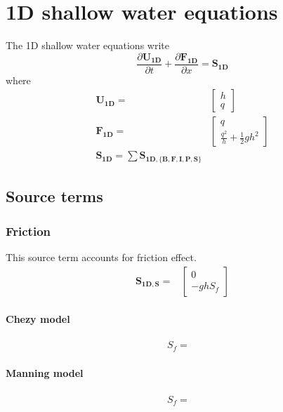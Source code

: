 \chapter{1D shallow water equations}
The 1D shallow water equations write
\begin{equation}
\displaystyle{\frac{\partial\mathbf{U_{1D}}}{\partial t}} + \displaystyle{\frac{\partial\mathbf{F_{1D}}}{\partial x}} = \mathbf{S_{1D}}
\label{eq:1DSWeq}
\end{equation}
where 
\begin{subequations}
\begin{align}
\mathbf{U_{1D}} = & \left[\begin{array}{c} h \\ q \end{array}\right] \\
\mathbf{F_{1D}} = & \left[\begin{array}{c} q \\ \displaystyle{\frac{q^2}{h}+\frac{1}{2}gh^2} \end{array}\right] \\
\mathbf{S_{1D}} = \sum\mathbf{S_{1D,\lbrace B,F,I,P,S\rbrace }}& 
\end{align}
\end{subequations}

\section{Source terms}
\subsection{Friction}
This source term accounts for friction effect.
\begin{align}
\mathbf{S_{1D,S}} = & \left[\begin{array}{c} 0 \\ -gh S_f \end{array}\right]
\end{align}
\subsubsection{Chezy model}
\begin{align}
S_f = & 
\end{align}

\subsubsection{Manning model}
\begin{align}
S_f = & 
\end{align}


